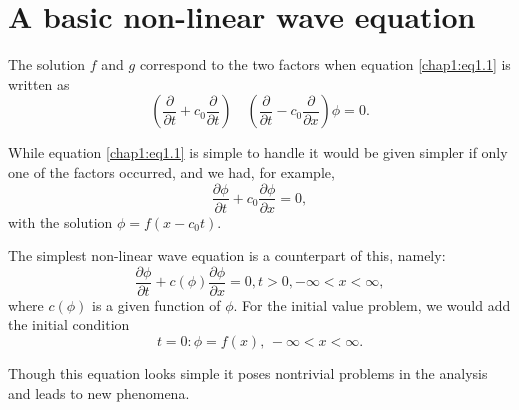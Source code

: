 \section{A basic non-linear wave equation}\label{chap1:sec1.2}

The solution $f$ and $g$ correspond to the two factors when equation \eqref{chap1:eq1.1} is written as 
$$
\left(\frac{\partial}{\partial t}+c_0\frac{\partial}{\partial t}\right)\quad \left(\frac{\partial}{\partial t}-c_0\frac{\partial}{\partial x}\right)\phi=0.
$$

While equation \eqref{chap1:eq1.1} is simple to handle it would be given simpler if only one of the factors occurred, and we had, for example,
$$
\frac{\partial\phi}{\partial t}+c_0\frac{\partial\phi}{\partial x}=0,
$$
with the solution $\phi=f(x-c_0 t)$. 

The simplest non-linear wave equation is a counterpart of this,\break
namely: 
\begin{equation}
\frac{\partial\phi}{\partial t}+c(\phi)\frac{\partial\phi}{\partial
  x}=0, t>0, -\infty <x < \infty,\tag{1.5}\label{chap1:eq1.5} 
\end{equation}
where $c(\phi)$ is a given function of $\phi$. For the initial value
problem, we would add the initial condition 
\begin{equation}
t=0:\phi=f(x),\, -\infty <x<\infty.\tag{1.6}\label{chap1:eq1.6}
\end{equation}\pageoriginale

Though this equation looks simple it poses nontrivial problems in the
analysis and leads to new phenomena. 

